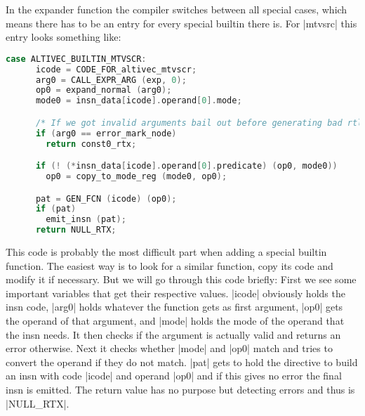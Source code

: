 In the expander function the compiler switches between all special cases, which means there has to be an entry for every special builtin there is. For |mtvsrc| this entry looks something like:
\begin{lstlisting}[language=C++,basicstyle=\ttfamily\scriptsize,keywordstyle=\color{red}]
case ALTIVEC_BUILTIN_MTVSCR:
      icode = CODE_FOR_altivec_mtvscr;
      arg0 = CALL_EXPR_ARG (exp, 0);
      op0 = expand_normal (arg0);
      mode0 = insn_data[icode].operand[0].mode;

      /* If we got invalid arguments bail out before generating bad rtl.  */
      if (arg0 == error_mark_node)
    	return const0_rtx;

      if (! (*insn_data[icode].operand[0].predicate) (op0, mode0))
     	op0 = copy_to_mode_reg (mode0, op0);

      pat = GEN_FCN (icode) (op0);
      if (pat)
    	emit_insn (pat);
      return NULL_RTX;
\end{lstlisting}
This code is probably the most difficult part when adding a special builtin function. The easiest way is to look for a similar function, copy its code and modify it if necessary. But we will go through this code briefly:
First we see some important variables that get their respective values. |icode| obviously holds the insn code, |arg0| holds whatever the function gets as first argument, |op0| gets the operand of that argument, and |mode| holds the mode of the operand that the insn needs. It then checks if the argument is actually valid and returns an error otherwise. Next it checks whether |mode| and |op0| match and tries to convert the operand if they do not match. |pat| gets to hold the directive to build an insn with code |icode| and operand |op0| and if this gives no error the final insn is emitted. The return value has no purpose but detecting errors and thus is |NULL_RTX|.

